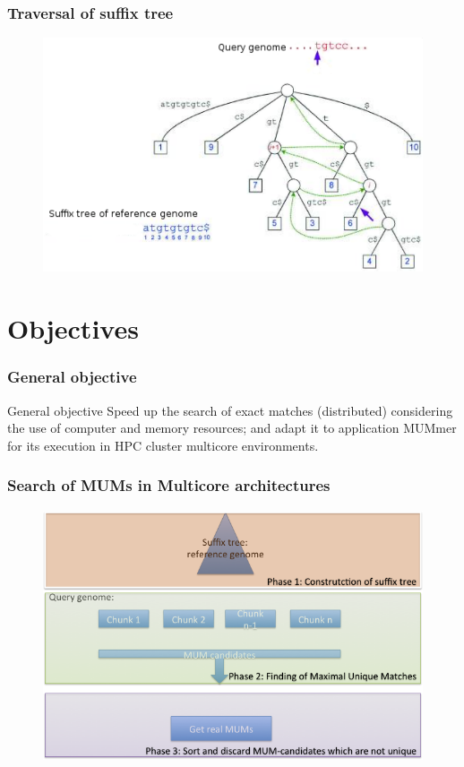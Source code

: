 \documentclass{beamer}
\begin{document}
\begin{frame}
  \frametitle{Traversal of suffix tree}
  \begin{figure}\includegraphics[scale=0.8]{st-mum.pdf}\end{figure}
\end{frame}
\section{Objectives}
\begin{frame}
 \frametitle{General objective}
 \begin{block}{General objective}
Speed up the search of exact matches (distributed) considering the use of computer and memory resources; and adapt it to application MUMmer for its execution in HPC cluster multicore environments.
\end{block}
\end{frame}
\begin{frame}
  \frametitle{Search of MUMs in Multicore architectures}
  \begin{figure}
    \includegraphics[scale=0.45]{Phases.png}
  \end{figure}
\end{frame}
\end{document}
